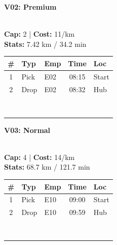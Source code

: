 \documentclass[a4paper,11pt]{article}
\begin{document}
\begin{minipage}[t]{0.24\textwidth}
    \centering
    \colorbox{velorablue}{\parbox{\dimexpr\linewidth-2\fboxsep}{\centering \color{white}\textbf{V02: Premium}}} \\
    \vspace{0.05cm}
    {\tiny \textbf{Cap:} 2 | \textbf{Cost:} 11/km \\ \textbf{Stats:} 7.42 km / 34.2 min}
    \vspace{0.05cm}
    
    \renewcommand{\arraystretch}{0.9}
    \setlength{\tabcolsep}{1pt}
    \tiny
    \begin{tabular}{c l l c l}
        \toprule
        \textbf{\#} & \textbf{Typ} & \textbf{Emp} & \textbf{Time} & \textbf{Loc} \\
        \midrule
        1 & Pick & E02 & 08:15 & Start \\
        \rowcolor{headergray} 2 & Drop & E02 & 08:32 & Hub \\
        & & & & \\
        & & & & \\
        & & & & \\
        & & & & \\
        & & & & \\
        & & & & \\
        & & & & \\
        & & & & \\
        \bottomrule
    \end{tabular}
\end{minipage}
\hfill
\begin{minipage}[t]{0.24\textwidth}
    \centering
    \colorbox{velorablue}{\parbox{\dimexpr\linewidth-2\fboxsep}{\centering \color{white}\textbf{V03: Normal}}} \\
    \vspace{0.05cm}
    {\tiny \textbf{Cap:} 4 | \textbf{Cost:} 14/km \\ \textbf{Stats:} 68.7 km / 121.7 min}
    \vspace{0.05cm}
    
    \renewcommand{\arraystretch}{0.9}
    \setlength{\tabcolsep}{1pt}
    \tiny
    \begin{tabular}{c l l c l}
        \toprule
        \textbf{\#} & \textbf{Typ} & \textbf{Emp} & \textbf{Time} & \textbf{Loc} \\
        \midrule
        1 & Pick & E10 & 09:00 & Start \\
        \rowcolor{headergray} 2 & Drop & E10 & 09:59 & Hub \\
        & & & & \\
        & & & & \\
        & & & & \\
        & & & & \\
        & & & & \\
        & & & & \\
        & & & & \\
        & & & & \\
        \bottomrule
    \end{tabular}
\end{minipage}
\end{document}
